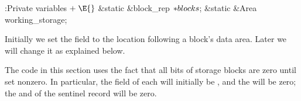 \Y\B\4:Private variables\X${}\mathrel+\E{}$\6
\&{static} \&{block\_rep} ${}{*}\\{blocks}{}$;\6
\&{static} \&{Area} \\{working\_storage};\par
\fi

Initially we set the  field to the location following a
block's data area. Later we will change it as explained below.

The code in this section uses the fact that all bits of storage blocks
are zero until set nonzero. In particular, the  field of each
 will initially be , and the  will
be zero;
the  and  of the sentinel record will be
zero.

